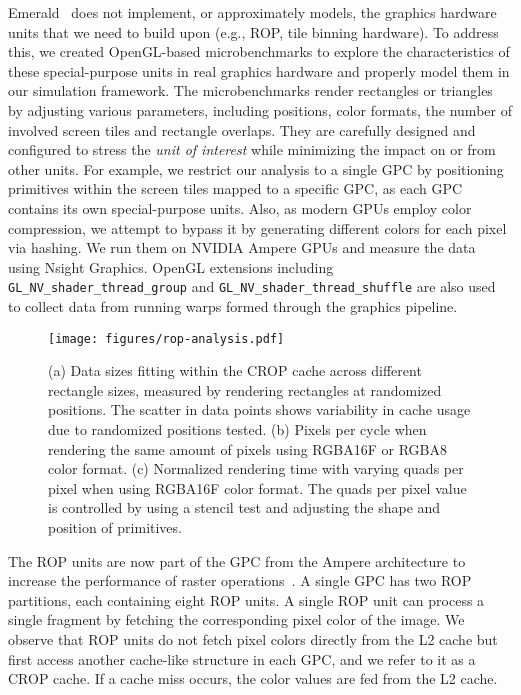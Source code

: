 

Emerald~\cite{gub:aam19} does not implement, or approximately models, the
graphics hardware units that we need to build upon (e.g., ROP, tile binning
hardware). To address this, we created OpenGL-based microbenchmarks to explore
the characteristics of these special-purpose units in real graphics hardware
and properly model them in our simulation framework.
%
The microbenchmarks render rectangles or triangles by adjusting various
parameters, including positions, color formats, the number of involved screen
tiles and rectangle overlaps. 
%
They are carefully designed and configured to stress the \emph{unit of
interest} while minimizing the impact on or from other units. 
%
For example, we restrict our analysis to a single GPC by positioning primitives
within the screen tiles mapped to a specific GPC, as each GPC contains its own
special-purpose units.
%
Also, as modern GPUs employ color compression, we attempt to bypass it by
generating different colors for each pixel via hashing.
%
We run them on NVIDIA Ampere GPUs and measure the data using Nsight Graphics.
OpenGL extensions including \texttt{\small GL\_NV\_shader\_thread\_group} and
\texttt{\small GL\_NV\_shader\_thread\_shuffle} are also used to collect data
from running warps formed through the graphics pipeline.
%

\begin{figure}[t]
  \centering
  \texttt{[image: figures/rop-analysis.pdf]}
  \caption{(a) Data sizes fitting within the CROP cache across different
  rectangle sizes, measured by rendering rectangles at randomized positions. The
  scatter in data points shows variability in cache usage due to randomized
  positions tested.
  (b) Pixels per cycle when rendering the same amount of pixels using
  RGBA16F or RGBA8 color format.  
  (c) Normalized rendering time with varying quads per pixel when using RGBA16F
  color format. The quads per pixel value is controlled by using a stencil test
  and adjusting the shape and position of primitives.
  }
  \vspace{-0.10in}
  \label{fig:rop-analysis}
\end{figure}

%
The ROP units are now part of the GPC from the Ampere architecture to increase
the performance of raster operations~\cite{ampere}.
%
A single GPC has two ROP partitions, each containing eight ROP units. A single
ROP unit can process a single fragment by fetching the corresponding pixel
color of the image.
%
We observe that ROP units do not fetch pixel colors directly from the
L2 cache but first access another cache-like structure in each GPC, and we
refer to it as a CROP cache.
%
If a cache miss occurs, the color values are fed from the L2 cache. 

